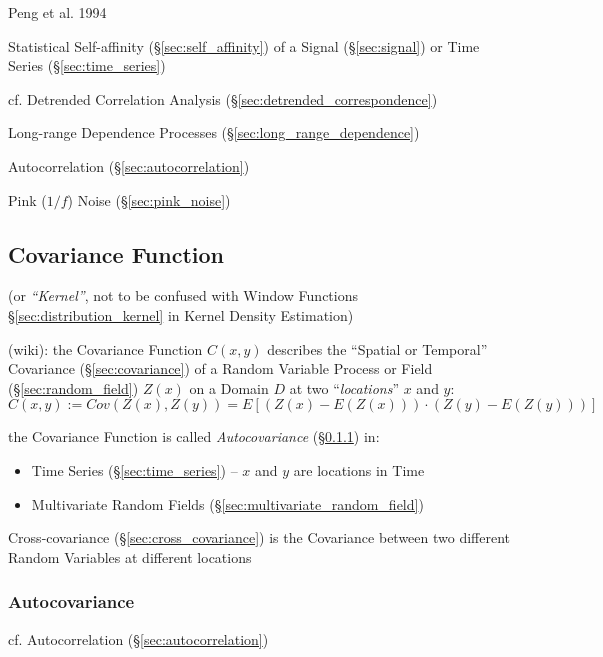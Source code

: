 Peng et al. 1994

Statistical Self-affinity (\S\ref{sec:self_affinity}) of a Signal
(\S\ref{sec:signal}) or Time Series (\S\ref{sec:time_series})

\fist cf. Detrended Correlation Analysis (\S\ref{sec:detrended_correspondence})

Long-range Dependence Processes (\S\ref{sec:long_range_dependence})

Autocorrelation (\S\ref{sec:autocorrelation})

Pink ($1/f$) Noise (\S\ref{sec:pink_noise})



\subsection{Covariance Function}\label{sec:covariance_function}\hfill

(or \emph{``Kernel''}, not to be confused with Window Functions
\S\ref{sec:distribution_kernel} in Kernel Density Estimation)

(wiki): the Covariance Function $C(x, y)$ describes the ``Spatial or Temporal''
Covariance (\S\ref{sec:covariance}) of a Random Variable Process or Field
(\S\ref{sec:random_field}) $Z(x)$ on a Domain $D$ at two ``\emph{locations}''
$x$ and $y$:
\[
  C(x, y) := Cov(Z(x), Z(y)) = E[(Z(x) - E(Z(x))) \cdot (Z(y) - E(Z(y)))]
\]

the Covariance Function is called \emph{Autocovariance}
(\S\ref{sec:autocovariance}) in:
\begin{itemize}
  \item Time Series (\S\ref{sec:time_series}) -- $x$ and $y$ are locations in
    Time
  \item Multivariate Random Fields (\S\ref{sec:multivariate_random_field})
\end{itemize}

Cross-covariance (\S\ref{sec:cross_covariance}) is the Covariance between two
different Random Variables at different locations



\subsubsection{Autocovariance}\label{sec:autocovariance}

cf. Autocorrelation (\S\ref{sec:autocorrelation}) %

